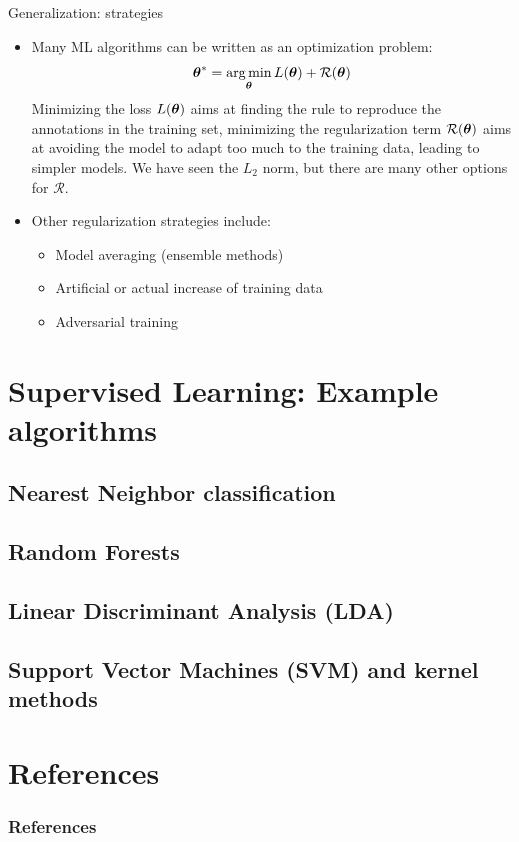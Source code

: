 \documentclass[xcolor=pdftex,dvipsnames,table]{beamer}
\begin{document}
\begin{frame}{Generalization: strategies}
\begin{itemize}
\item Many ML algorithms can be written as an optimization problem:
\begin{equation}
\boldsymbol{\theta} ^{\ast} = \operatorname*{arg\,min}_{\boldsymbol{\theta}} L (\boldsymbol{\theta}) + \mathcal{R}(\boldsymbol{\theta})
\end{equation}
Minimizing the loss $L (\boldsymbol{\theta})$ aims at finding the rule to reproduce the annotations in the training set, minimizing the regularization term $\mathcal{R}(\boldsymbol{\theta})$ aims at avoiding the model to adapt too much to the training data, leading to simpler models. We have seen the $L_2$ norm, but there are many other options for $\mathcal{R}$. 
\item Other regularization strategies include:
\begin{itemize}
\item Model averaging (ensemble methods)
\item Artificial or actual increase of training data
\item Adversarial training
\end{itemize}
\end{itemize}
\end{frame}

\section{Supervised Learning: Example algorithms}
\subsection{Nearest Neighbor classification}
\subsection{Random Forests}
\subsection{Linear Discriminant Analysis (LDA)}
\subsection{Support Vector Machines (SVM) and kernel methods}

\section{References}
\begin{frame}[allowframebreaks]
	\frametitle{References}
	
\end{frame}
\end{document}
